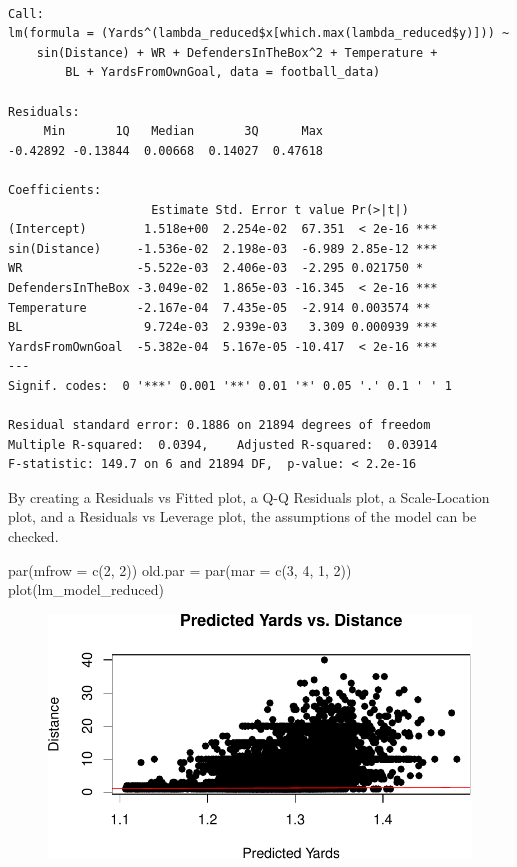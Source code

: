 \documentclass[
  super,
  preprint,
  3p]{elsarticle}
\newenvironment{Shaded}{\begin{snugshade}}{\end{snugshade}}
\newcommand{\AttributeTok}[1]{\textcolor[rgb]{0.40,0.45,0.13}{#1}}
\newcommand{\DecValTok}[1]{\textcolor[rgb]{0.68,0.00,0.00}{#1}}
\newcommand{\FunctionTok}[1]{\textcolor[rgb]{0.28,0.35,0.67}{#1}}
\newcommand{\NormalTok}[1]{\textcolor[rgb]{0.00,0.23,0.31}{#1}}
\newcommand{\OtherTok}[1]{\textcolor[rgb]{0.00,0.23,0.31}{#1}}
\begin{document}
\begin{verbatim}

Call:
lm(formula = (Yards^(lambda_reduced$x[which.max(lambda_reduced$y)])) ~ 
    sin(Distance) + WR + DefendersInTheBox^2 + Temperature + 
        BL + YardsFromOwnGoal, data = football_data)

Residuals:
     Min       1Q   Median       3Q      Max 
-0.42892 -0.13844  0.00668  0.14027  0.47618 

Coefficients:
                    Estimate Std. Error t value Pr(>|t|)    
(Intercept)        1.518e+00  2.254e-02  67.351  < 2e-16 ***
sin(Distance)     -1.536e-02  2.198e-03  -6.989 2.85e-12 ***
WR                -5.522e-03  2.406e-03  -2.295 0.021750 *  
DefendersInTheBox -3.049e-02  1.865e-03 -16.345  < 2e-16 ***
Temperature       -2.167e-04  7.435e-05  -2.914 0.003574 ** 
BL                 9.724e-03  2.939e-03   3.309 0.000939 ***
YardsFromOwnGoal  -5.382e-04  5.167e-05 -10.417  < 2e-16 ***
---
Signif. codes:  0 '***' 0.001 '**' 0.01 '*' 0.05 '.' 0.1 ' ' 1

Residual standard error: 0.1886 on 21894 degrees of freedom
Multiple R-squared:  0.0394,    Adjusted R-squared:  0.03914 
F-statistic: 149.7 on 6 and 21894 DF,  p-value: < 2.2e-16
\end{verbatim}

By creating a Residuals vs Fitted plot, a Q-Q Residuals plot, a
Scale-Location plot, and a Residuals vs Leverage plot, the assumptions
of the model can be checked.

\begin{Shaded}
\begin{Highlighting}[]
\FunctionTok{par}\NormalTok{(}\AttributeTok{mfrow =} \FunctionTok{c}\NormalTok{(}\DecValTok{2}\NormalTok{, }\DecValTok{2}\NormalTok{))}
\NormalTok{old.par }\OtherTok{=} \FunctionTok{par}\NormalTok{(}\AttributeTok{mar =} \FunctionTok{c}\NormalTok{(}\DecValTok{3}\NormalTok{, }\DecValTok{4}\NormalTok{, }\DecValTok{1}\NormalTok{, }\DecValTok{2}\NormalTok{))}
\FunctionTok{plot}\NormalTok{(lm\_model\_reduced)}
\end{Highlighting}
\end{Shaded}

\begin{figure}[H]

{\centering \includegraphics{project_report_files/figure-pdf/unnamed-chunk-38-1.pdf}

}

\end{figure}
\end{document}
